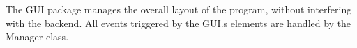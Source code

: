 \tab The GUI package manages the overall layout of the program, without interfering with the backend. All events triggered by the GUI.s elements are handled by the Manager class. 

